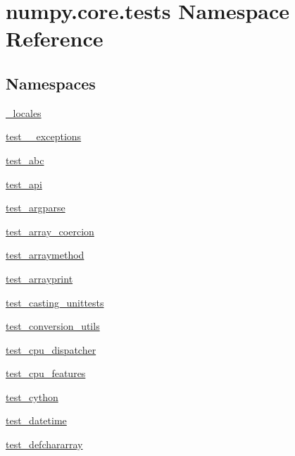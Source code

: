 \hypertarget{namespacenumpy_1_1core_1_1tests}{}\section{numpy.\+core.\+tests Namespace Reference}
\label{namespacenumpy_1_1core_1_1tests}
\subsection*{Namespaces}
\begin{DoxyCompactItemize}
\item 
 \hyperlink{namespacenumpy_1_1core_1_1tests_1_1__locales}{\+\_\+locales}
\item 
 \hyperlink{namespacenumpy_1_1core_1_1tests_1_1test____exceptions}{test\+\_\+\+\_\+exceptions}
\item 
 \hyperlink{namespacenumpy_1_1core_1_1tests_1_1test__abc}{test\+\_\+abc}
\item 
 \hyperlink{namespacenumpy_1_1core_1_1tests_1_1test__api}{test\+\_\+api}
\item 
 \hyperlink{namespacenumpy_1_1core_1_1tests_1_1test__argparse}{test\+\_\+argparse}
\item 
 \hyperlink{namespacenumpy_1_1core_1_1tests_1_1test__array__coercion}{test\+\_\+array\+\_\+coercion}
\item 
 \hyperlink{namespacenumpy_1_1core_1_1tests_1_1test__arraymethod}{test\+\_\+arraymethod}
\item 
 \hyperlink{namespacenumpy_1_1core_1_1tests_1_1test__arrayprint}{test\+\_\+arrayprint}
\item 
 \hyperlink{namespacenumpy_1_1core_1_1tests_1_1test__casting__unittests}{test\+\_\+casting\+\_\+unittests}
\item 
 \hyperlink{namespacenumpy_1_1core_1_1tests_1_1test__conversion__utils}{test\+\_\+conversion\+\_\+utils}
\item 
 \hyperlink{namespacenumpy_1_1core_1_1tests_1_1test__cpu__dispatcher}{test\+\_\+cpu\+\_\+dispatcher}
\item 
 \hyperlink{namespacenumpy_1_1core_1_1tests_1_1test__cpu__features}{test\+\_\+cpu\+\_\+features}
\item 
 \hyperlink{namespacenumpy_1_1core_1_1tests_1_1test__cython}{test\+\_\+cython}
\item 
 \hyperlink{namespacenumpy_1_1core_1_1tests_1_1test__datetime}{test\+\_\+datetime}
\item 
 \hyperlink{namespacenumpy_1_1core_1_1tests_1_1test__defchararray}{test\+\_\+defchararray}

\end{DoxyCompactItemize}
